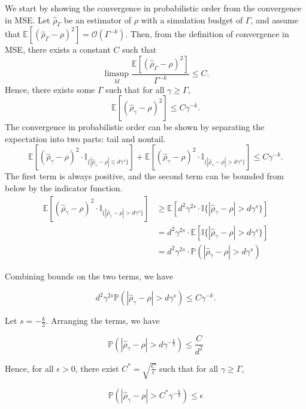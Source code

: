 \documentclass{article}
\begin{document}
We start by showing the convergence in probabilistic order from the convergence in MSE.
Let $\hat{\rho}_{\Gamma}$ be an estimator of $\rho$ with a simulation budget of $\Gamma$, and assume that $\mathbb{E} \left[ \left(\hat{\rho}_{\Gamma} - \rho\right)^2 \right] = \mathcal{O} \left( \Gamma^{-k} \right)$.
Then, from the definition of convergence in MSE, there exists a constant $C$ such that 
$$
    \limsup_{M} \frac{\mathbb{E} \left[ \left(\hat{\rho}_{\Gamma} - \rho\right)^2 \right]}{\Gamma^{-k}} \leq C.
$$
Hence, there exists some $\Gamma$ such that for all $\gamma \geq \Gamma$,
$$
\mathbb{E} \left[ \left(\hat{\rho}_{\gamma} - \rho\right)^2 \right] \leq C\gamma^{-k}.
$$
The convergence in probabilistic order can be shown by separating the expectation into two parts: tail and nontail.
$$
\mathbb{E} \left[ \left(\hat{\rho}_{\gamma} - \rho\right)^2 \cdot \mathbb{I}_{\{|\hat{\rho}_{\gamma} - \rho| \leq d\gamma^s\}} \right] + \mathbb{E} \left[ \left(\hat{\rho}_{\gamma} - \rho\right)^2 \cdot \mathbb{I}_{\{|\hat{\rho}_{\gamma} - \rho| > d\gamma^s\}} \right] \leq C\gamma^{-k}.
$$
The first term is always positive, and the second term can be bounded from below by the indicator function.
\begin{align*}
\mathbb{E} \left[ \left(\hat{\rho}_{\gamma} - \rho\right)^2 \cdot \mathbb{I}_{\{|\hat{\rho}_{\gamma} - \rho| > d\gamma^s\}} \right] 
& \geq \mathbb{E} \left[ d^2 \gamma^{2s} \cdot \mathbb{I}\{|\hat{\rho}_{\gamma} - \rho| > d\gamma^s\} \right] \\
& = d^2 \gamma^{2s} \cdot \mathbb{E} \left[ \mathbb{I}\{|\hat{\rho}_{\gamma} - \rho| > d\gamma^s \} \right] \\
& = d^2 \gamma^{2s} \cdot \mathbb{P} \left(|\hat{\rho}_{\gamma} - \rho| > d\gamma^s \right)
\end{align*}

Combining bounds on the two terms, we have

$$
    d^2 \gamma^{2s} \mathbb{P} \left(|\hat{\rho}_{\gamma} - \rho| > d\gamma^s \right) \leq C \gamma^{-k}.
$$

Let $s = -\frac{k}{2}$. Arranging the terms, we have

$$
    \mathbb{P} \left( |\hat{\rho}_{\gamma} - \rho| > d\gamma^{-\frac{k}{2}} \right) \leq \frac{C}{d^2}
$$

Hence, for all $\epsilon >0$, there exist $C^* = \sqrt{\frac{C}{\epsilon}}$ such that for all $\gamma \geq \Gamma$,

$$
    \mathbb{P} \left( |\hat{\rho}_{\gamma} - \rho| > C^*\gamma^{-\frac{k}{2}} \right) \leq \epsilon
$$
\end{document}
